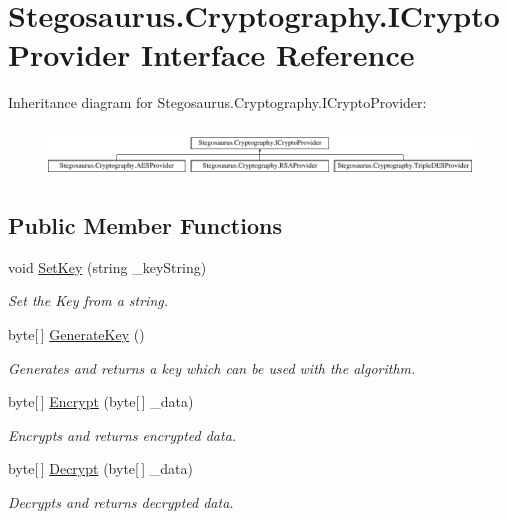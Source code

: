 \hypertarget{interface_stegosaurus_1_1_cryptography_1_1_i_crypto_provider}{}\section{Stegosaurus.\+Cryptography.\+I\+Crypto\+Provider Interface Reference}
\label{interface_stegosaurus_1_1_cryptography_1_1_i_crypto_provider}
Inheritance diagram for Stegosaurus.\+Cryptography.\+I\+Crypto\+Provider\+:\begin{figure}[H]
\begin{center}
\leavevmode
\includegraphics[height=1.323877cm]{interface_stegosaurus_1_1_cryptography_1_1_i_crypto_provider}
\end{center}
\end{figure}
\subsection*{Public Member Functions}
\begin{DoxyCompactItemize}
\item 
void \hyperlink{interface_stegosaurus_1_1_cryptography_1_1_i_crypto_provider_a95c1bb37e8bfdb62e6f66e8094d9d51b}{Set\+Key} (string \+\_\+key\+String)
\begin{DoxyCompactList}\small\item\em Set the Key from a string. \end{DoxyCompactList}\item 
byte\mbox{[}$\,$\mbox{]} \hyperlink{interface_stegosaurus_1_1_cryptography_1_1_i_crypto_provider_ae25c64411409f0cc41c2282030c6dc5c}{Generate\+Key} ()
\begin{DoxyCompactList}\small\item\em Generates and returns a key which can be used with the algorithm. \end{DoxyCompactList}\item 
byte\mbox{[}$\,$\mbox{]} \hyperlink{interface_stegosaurus_1_1_cryptography_1_1_i_crypto_provider_a2222231bf16ba92e8efc8d515943aacd}{Encrypt} (byte\mbox{[}$\,$\mbox{]} \+\_\+data)
\begin{DoxyCompactList}\small\item\em Encrypts and returns encrypted data. \end{DoxyCompactList}\item 
byte\mbox{[}$\,$\mbox{]} \hyperlink{interface_stegosaurus_1_1_cryptography_1_1_i_crypto_provider_a673607b0f3392591db9c647d2499f38d}{Decrypt} (byte\mbox{[}$\,$\mbox{]} \+\_\+data)
\begin{DoxyCompactList}\small\item\em Decrypts and returns decrypted data. \end{DoxyCompactList}\end{DoxyCompactItemize}
